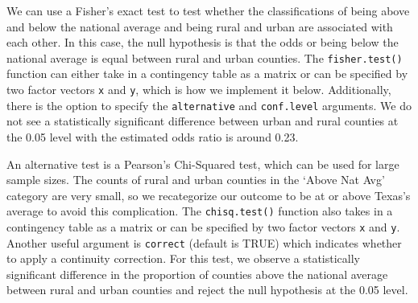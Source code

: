 \documentclass[
  letterpaper,
]{krantz}
\makeatletter
\newenvironment{Shaded}{\begin{snugshade}}{\end{snugshade}}
\newcommand{\CommentTok}[1]{\textcolor[rgb]{0.37,0.37,0.37}{#1}}
\newcommand{\FunctionTok}[1]{\textcolor[rgb]{0.28,0.35,0.67}{#1}}
\newcommand{\NormalTok}[1]{\textcolor[rgb]{0.00,0.23,0.31}{#1}}
\newcommand{\OtherTok}[1]{\textcolor[rgb]{0.00,0.23,0.31}{#1}}
\newcommand{\SpecialCharTok}[1]{\textcolor[rgb]{0.37,0.37,0.37}{#1}}
\newenvironment{kframe}{%
\medskip{}
\setlength{\fboxsep}{.8em}
 \def\at@end@of@kframe{}%
 \ifinner\ifhmode%
  \def\at@end@of@kframe{\end{minipage}}%
  \begin{minipage}{\columnwidth}%
 \fi\fi%
 \def\FrameCommand##1{\hskip\@totalleftmargin \hskip-\fboxsep
 \colorbox{shadecolor}{##1}\hskip-\fboxsep
     \hskip-\linewidth \hskip-\@totalleftmargin \hskip\columnwidth}%
 \MakeFramed {\advance\hsize-\width
   \@totalleftmargin\z@ \linewidth\hsize
   \@setminipage}}%
 {\par\unskip\endMakeFramed%
 \at@end@of@kframe}
\renewenvironment{Shaded}{\begin{kframe}}{\end{kframe}}
\makeatother
\begin{document}
We can use a Fisher's exact test to test whether the classifications of
being above and below the national average and being rural and urban are
associated with each other. In this case, the null hypothesis is that
the odds or being below the national average is equal between rural and
urban counties. The \texttt{fisher.test()} function can either take in a
contingency table as a matrix or can be specified by two factor vectors
\texttt{x} and \texttt{y}, which is how we implement it below.
Additionally, there is the option to specify the \texttt{alternative}
and \texttt{conf.level} arguments. We do not see a statistically
significant difference between urban and rural counties at the 0.05
level with the estimated odds ratio is around 0.23.

\begin{Shaded}
\end{Shaded}

An alternative test is a Pearson's Chi-Squared test, which can be used
for large sample sizes. The counts of rural and urban counties in the
`Above Nat Avg' category are very small, so we recategorize our outcome
to be at or above Texas's average to avoid this complication. The
\texttt{chisq.test()} function also takes in a contingency table as a
matrix or can be specified by two factor vectors \texttt{x} and
\texttt{y}. Another useful argument is \texttt{correct} (default is
TRUE) which indicates whether to apply a continuity correction. For this
test, we observe a statistically significant difference in the
proportion of counties above the national average between rural and
urban counties and reject the null hypothesis at the 0.05 level.
\end{document}
